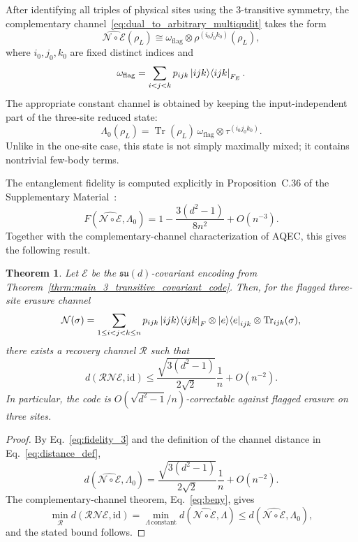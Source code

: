 \documentclass[10pt,twocolumn,superscriptaddress,aps,amsmath,amssymb,citeautoscript,floatfix,prx,longbibliography]{revtex4-2}
\newtheorem{theorem}{Theorem}
\theoremstyle{plain}
\theoremstyle{plain}
\theoremstyle{plain}
\theoremstyle{plain}
\theoremstyle{plain}
\theoremstyle{plain}
\begin{document}
After identifying all triples of physical sites using the $3$-transitive symmetry, the complementary channel~\eqref{eq:dual_to_arbitrary_multiqudit} takes the form
$$
    \widehat{\mathcal N\circ\mathcal E}(\rho_L)
    \cong
    \omega_{\mathrm{flag}}
    \otimes
    \rho^{(i_0j_0k_0)}(\rho_L),
$$
where $i_0,j_0,k_0$ are fixed distinct indices and
$$
    \omega_{\mathrm{flag}}
    =
    \sum_{i<j<k}
    p_{ijk}
    \ket{ijk}\!\bra{ijk}_{F_E}.
$$
The appropriate constant channel is obtained by keeping the input-independent part of the three-site reduced state:
$$
    \Lambda_0(\rho_L)
    =
    \operatorname{Tr}(\rho_L)\,
    \omega_{\mathrm{flag}}
    \otimes
    \tau^{(i_0j_0k_0)} .
$$
Unlike in the one-site case, this state is not simply maximally mixed; it contains nontrivial few-body terms.

The entanglement fidelity is computed explicitly in Proposition~C.36 of the Supplementary Material~\cite{SuppMat}:
\begin{equation}\label{eq:fidelity_3}
    F\left(\widehat{\mathcal N\circ\mathcal E},\Lambda_0\right)
    =
    1
    -
    \frac{3(d^2-1)}{8n^2}
    +
    O(n^{-3}) .
\end{equation}
Together with the complementary-channel characterization of AQEC, this gives the following result.

\begin{theorem}
Let $\mathcal E$ be the $\mathfrak{su}(d)$-covariant encoding from Theorem~\ref{thrm:main_3_transitive_covariant_code}. Then, for the flagged three-site erasure channel
$$
    \mathcal N(\sigma)
    =
    \sum_{1\le i<j<k\le n}
    p_{ijk}
    \ket{ijk}\!\bra{ijk}_F
    \otimes
    \ket e\!\bra e_{ijk}
    \otimes
    \operatorname{Tr}_{ijk}(\sigma),
$$
there exists a recovery channel $\mathcal R$ such that
$$
    d(\mathcal R\mathcal N\mathcal E,\mathrm{id})
    \le
    \frac{\sqrt{3(d^2-1)}}{2\sqrt 2}
    \frac1n
    +
    O(n^{-2}) .
$$
In particular, the code is $O(\sqrt{d^2-1}/n)$-correctable against flagged erasure on three sites.
\end{theorem}

\begin{proof}
By Eq.~\eqref{eq:fidelity_3} and the definition of the channel distance in Eq.~\eqref{eq:distance_def},
$$
    d\left(\widehat{\mathcal N\circ\mathcal E},\Lambda_0\right)
    =
    \frac{\sqrt{3(d^2-1)}}{2\sqrt 2}
    \frac1n
    +
    O(n^{-2}) .
$$
The complementary-channel theorem, Eq.~\eqref{eq:beny}, gives
$$
    \min_{\mathcal R}
    d(\mathcal R\mathcal N\mathcal E,\mathrm{id})
    =
    \min_{\Lambda\,\mathrm{constant}}
    d\left(\widehat{\mathcal N\circ\mathcal E},\Lambda\right)
    \le
    d\left(\widehat{\mathcal N\circ\mathcal E},\Lambda_0\right),
$$
and the stated bound follows.
\end{proof}
\end{document}
